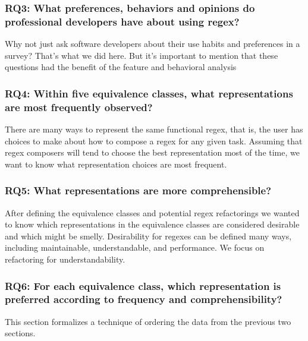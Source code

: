 \subsubsection{RQ3: What preferences, behaviors and opinions do professional developers have about using regex?}

 Why not just ask software developers about their use habits and preferences in a survey?  That's what we did here.  But it's important to mention that these questions had the benefit of the feature and behavioral analysis



\subsubsection{RQ4: Within five equivalence classes, what representations are most frequently observed?}

There are many ways to represent the same functional regex, that is, the user has choices to make about how to compose a regex for any given task.  Assuming that regex composers will tend to choose the best representation most of the time, we want to know what representation choices are most frequent.

\subsubsection{RQ5: What representations are more comprehensible?}

After defining the equivalence classes and potential  regex refactorings we wanted to know which representations in the equivalence classes  are considered desirable and which might be smelly. Desirability for regexes can be defined many ways, including maintainable,  understandable, and performance.
We focus on refactoring for understandability.

\subsubsection{RQ6: For each equivalence class, which representation is preferred according to frequency and comprehensibility?}

This section formalizes a technique of ordering the data from the previous two sections.



